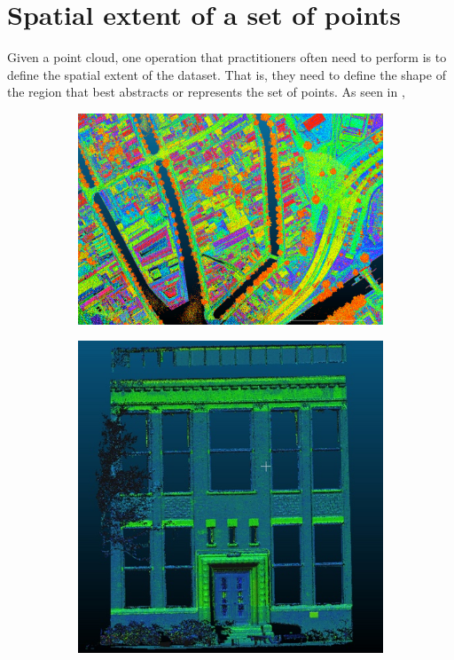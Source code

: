 
\setchapterpreamble[u]{\margintoc}
\graphicspath{{spatialextent/}}

\chapter{Spatial extent of a set of points}%
\label{chap:spatialextent}


Given a point cloud, one operation that practitioners often need to perform is to define the spatial extent of the dataset.
That is, they need to define the shape of the region that best abstracts or represents the set of points.
As seen in , 
\begin{figure}
  \centering
  \begin{subfigure}[b]{0.49\linewidth}
    \centering
    \includegraphics[width=\textwidth]{figs/ahn3-water.png}
    \caption{}
  \end{subfigure}%
  \qquad
  \begin{subfigure}[b]{0.33\linewidth}
    \centering
    \includegraphics[page=2,width=\textwidth]{figs/facade.jpg}

\end{subfigure}
\end{figure}

